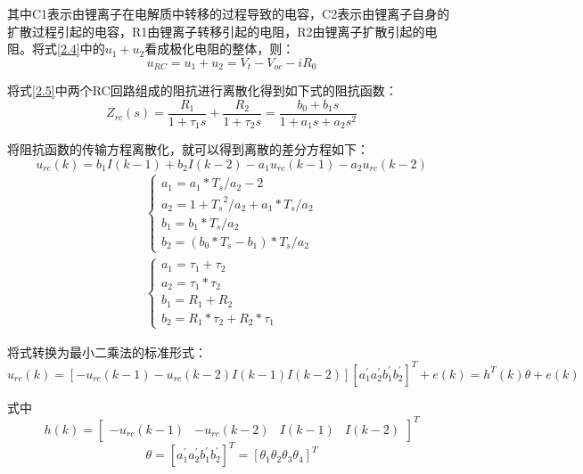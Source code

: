 \begin{enumerate}
其中C1表示由锂离子在电解质中转移的过程导致的电容，C2表示由锂离子自身的扩散过程引起的电容，R1由锂离子转移引起的电阻，R2由锂离子扩散引起的电阻。将式\ref{2.4}中的${u_1} + {u_2}$看成极化电阻的整体，则：
\begin{equation}\label{2.5}
{u_{RC}} = {u_1} + {u_2} = {V_t} - {V_{oc}} - i{R_0}
\end{equation}

将式\ref{2.5}中两个RC回路组成的阻抗进行离散化得到如下式的阻抗函数：
\begin{equation}
{Z_{rc}}(s) = \frac{{{R_1}}}{{1 + {\tau _1}s}} + \frac{{{R_2}}}{{1 + {\tau _2}s}} = \frac{{{b_0} + {b_1}s}}{{1 + {a_1}s + {a_2}{s^2}}}
\end{equation}

将阻抗函数的传输方程离散化，就可以得到离散的差分方程如下：
\begin{equation}\label{2.7}
{u_{rc}}(k) = {b_1}I(k - 1) + {b_2}I(k - 2) - {a_1}{u_{rc}}(k - 1) - {a_2}{u_{rc}}(k - 2)
\end{equation}
\begin{equation}
\begin{array}{l}
\left\{ \begin{array}{l}
{a_1} = {a_1} * {T_s}/{a_2} - 2\\
{a_2} = 1 + {T_s}^2/{a_2} + {a_1} * {T_s}/{a_2}\\
{b_1} = {b_1} * {T_s}/{a_2}\\
{b_2} = ({b_0} * {T_s} - {b_1}) * {T_s}/{a_2}
\end{array} \right.\\
\left\{ \begin{array}{l}
{a_1} = {\tau _1} + {\tau _2}\\
{a_2} = {\tau _1} * {\tau _2}\\
{b_1} = {R_1} + {R_2}\\
{b_2} = {R_1} * {\tau _2} + {R_2} * {\tau _1}
\end{array} \right.
\end{array}
\end{equation}

将式\label{2.7}转换为最小二乘法的标准形式：
\begin{equation}
{{u}_{rc}}(k)=[-{{u}_{rc}}(k-1)-{{u}_{rc}}(k-2)I(k-1)I(k-2)]{{[a_{1}^{'}a_{2}^{'}b_{1}^{'}b_{2}^{'}]}^{T}}+e(k)={{h}^{T}}(k)\theta +e(k)
\end{equation}

式中
\begin{equation}
h(k) = {\left[ {\begin{array}{*{20}{c}}
{ - {u_{rc}}(k - 1)}&{ - {u_{rc}}(k - 2)}&{I(k - 1)}&{I(k - 2)}
\end{array}} \right]^T}
\end{equation}
\begin{equation}
\theta ={{\left[ a_{1}^{'}a_{2}^{'}b_{1}^{'}b_{2}^{'} \right]}^{T}}={{\left[ {{\theta }_{1}}{{\theta }_{2}}{{\theta }_{3}}{{\theta }_{4}} \right]}^{T}}
\end{equation}


\end{enumerate}

